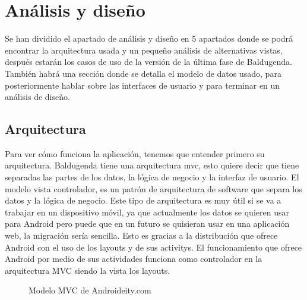 \section{Análisis y diseño}
\label{secc:análisis y diseño}
Se han dividido el apartado de análisis y diseño en 5 apartados donde se podrá encontrar la arquitectura usada y un pequeño análisis de alternativas vistas, después estarán los casos de uso de la versión de la última fase de Baldugenda. También habrá una sección donde se detalla el modelo de datos usado, para posteriormente hablar sobre las interfaces de usuario y para terminar en un análisis de diseño. 
\subsection{Arquitectura}
\label{subsecc:arquitectura}

Para ver cómo funciona la aplicación, tenemos que entender primero su arquitectura. Baldugenda tiene una arquitectura \acrshort{mvc}, esto quiere decir que tiene separadas las partes de los datos, la lógica de negocio y la interfaz de usuario.
El modelo vista controlador, es un patrón de arquitectura de software que separa los datos y la lógica de negocio. Este tipo de arquitectura es muy útil si se va a trabajar en un dispositivo móvil, ya que actualmente los datos se quieren usar para Android pero puede que en un futuro se quisieran usar en una aplicación web, la migración sería sencilla. Esto es gracias a la distribución que ofrece Android con el uso de los layouts y de sus \glspl{activity}.
El funcionamiento que ofrece Android por medio de sus actividades funciona como controlador en la arquitectura MVC siendo la vista los layouts.

\begin{figure}[H] 
  \begin{center} 
    \caption{Modelo MVC de Androideity.com} 
    \label{fig:ModeloMVC} 
  \end{center} 
\end{figure}

